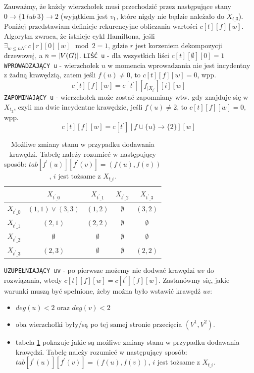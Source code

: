 \documentclass[12pt, oneside]{report}
\begin{document}
Zauważmy, że każdy wierzchołek musi przechodzić przez następujące stany $0 \to \{1 \ lub \ 3\} \to 2$ (wyjątkiem jest $v_1$, które nigdy nie będzie należało do $X_{t\_3}$). Poniżej przedstawiam definicje rekurencyjne obliczania wartości $c[t][f][w]$. Algorytm zwraca, że istnieje cykl Hamiltona, jeśli $\exists_{w \leq nN}: c[r][0][w] \mod 2 = 1$, gdzie $r$ jest korzeniem dekompozycji drzewowej, a $n = \abs{V(G)}$.
\newline\newline
\texttt{LIŚĆ u} - dla wszystkich liści $c[t][\emptyset][0] = 1$
\newline\newline
\texttt{WPROWADZAJĄCY u} - wierzchołek $u$ w momencia wprowadzania nie jest incydentny z żadną krawędzią, zatem jeśli $f(u) \neq 0$, to $c[t][f][w] = 0$, wpp.
$$c[t][f][w] = c[t^{\prime}][f_{\big|X_{t^{\prime}}}][i][w]$$
\newline
\texttt{ZAPOMINAJĄCY u} - wierzchołek może zostać zapomniany wtw. gdy znajduje się w $X_{t_2}$, czyli ma dwie incydentne krawędzie, jeśli $f(u) \neq 2$, to $c[t][f][w] = 0$, wpp.
$$c[t][f][w] = c[t^{\prime}][f \cup \{u\} \to \{2\}][w]$$
\newline

\begin{table}
\centering
\label{add_edge_table}
\begin{tabular}{c|c|c|c|c}
 & $X_{t^{\prime}\_0}$ & $X_{t^{\prime}\_1}$ & $X_{t^{\prime}\_2}$ & $X_{t^{\prime}\_3}$ \\
\hline
$X_{t^{\prime}\_0}$ & $(1,1) \vee (3,3)$ & $(1,2)$ & $\emptyset$ & $(3,2)$ \\
\hline
$X_{t^{\prime}\_1}$ & $(2,1)$ & $(2,2)$ & $\emptyset$ & $\emptyset$ \\
\hline
$X_{t^{\prime}\_2}$ & $\emptyset$ & $\emptyset$ & $\emptyset$ & $\emptyset$ \\
\hline
$X_{t^{\prime}\_3}$ & $(2,3)$ & $\emptyset$ & $\emptyset$ & $(2,2)$ \\
\end{tabular}
\caption{Możliwe zmiany stanu w przypadku dodawania krawędzi. Tabelę należy rozumieć w następujący sposób: $tab[f^{\prime}(u)][f^{\prime}(v)] = (f(u), f(v))$, $i$ jest tożsame z $X_{t\_i}$.}
\end{table}
$$$$
\texttt{UZUPEŁNIAJĄCY uv} - po pierwsze możemy nie dodwać krawędzi $uv$ do rozwiązania, wtedy $c[t][f][w] = c[t^{\prime}][f][w]$. Zastanówmy się, jakie warunki muszą być spełnione, żeby można było wstawić krawędź $uv$:
\begin{itemize}
\item $deg(u) < 2$ oraz $deg(v) < 2$
\item oba wierzchołki były/są po tej samej stronie przecięcia $(V^1, V^2)$.
\item tabela \ref{add_edge_table} pokazuje jakie są możliwe zmiany stanu w przypadku dodawania krawędzi. Tabelę należy rozumieć w następujący sposób: $tab[f^{\prime}(u)][f^{\prime}(v)] = (f(u), f(v))$, $i$ jest tożsame z $X_{t\_i}$.
\end{itemize}
\end{document}
